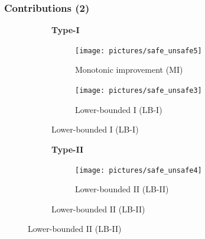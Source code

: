 \documentclass{beamer}
\makeatletter
\renewcommand{\arraystretch}{1.2}%
\DeclareRobustCommand{\eg}{e.g.,\@\xspace}
\makeatother
\begin{document}
\begin{frame}
\frametitle{Contributions (2)}

\begin{figure}[p]
\begin{subfigure}[t]{0.49\textwidth}
\centering
\textbf{Type-I}

\begin{subfigure}{\textwidth}
\centering
\texttt{[image: pictures/safe\_unsafe5]}
\caption{Monotonic improvement (MI)}
\end{subfigure}
\vfill
\begin{subfigure}{\textwidth}
\centering
\texttt{[image: pictures/safe\_unsafe3]}
\caption{Lower-bounded I (LB-I)}
\end{subfigure}

\end{subfigure}
\hfill
\begin{subfigure}[t]{0.49\textwidth}
\centering
\textbf{Type-II}

\begin{subfigure}[p]{\textwidth}
\texttt{[image: pictures/safe\_unsafe4]}
\caption{Lower-bounded II (LB-II)}
\end{subfigure}
\end{subfigure}
\end{figure}

\end{frame}



%
%
%
%

\end{document}
